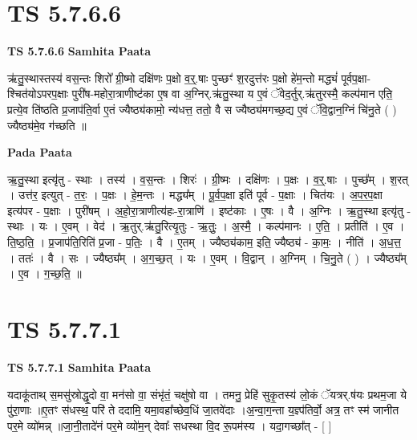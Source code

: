 \documentclass[17pt]{extarticle}
\begin{document}

\section{ TS 5.7.6.6 }

\textbf{TS 5.7.6.6 } \newline
\textbf{Samhita Paata} \newline

ऋ॑तु॒स्थास्तस्य॑ वस॒न्तः शिरो᳚ ग्री॒ष्मो दक्षि॑णः प॒क्षो व॒र्॒.षाः पुच्छꣳ॑ श॒रदुत्त॑रः प॒क्षो हे॑म॒न्तो मद्ध्यं॑ पूर्वप॒क्षा-श्चित॑योऽपरप॒क्षाः पुरी॑ष-महोरा॒त्राणीष्ट॑का ए॒ष वा अ॒ग्निर्.ऋ॑तु॒स्था य ए॒वं ॅवेद॒र्तुर्.ऋ॑तुरस्मै॒ कल्प॑मान एति॒ प्रत्ये॒व ति॑ष्ठति प्र॒जाप॑ति॒र्वा ए॒तं ज्यैष्ठ्य॑कामो॒ न्य॑धत्त॒ ततो॒ वै स ज्यैष्ठ्य॑मगच्छ॒द्य ए॒वं ॅवि॒द्वान॒ग्निं चि॑नु॒ते ( ) ज्यैष्ठ्य॑मे॒व ग॑च्छति ॥ \newline

\textbf{Pada Paata} \newline

ऋ॒तु॒स्था इत्यृ॑तु - स्थाः । तस्य॑ । व॒स॒न्तः । शिरः॑ । ग्री॒ष्मः । दक्षि॑णः । प॒क्षः । व॒र्॒.षाः । पुच्छ᳚म् । श॒रत् । उत्त॑र॒ इत्युत् - त॒रः॒ । प॒क्षः । हे॒म॒न्तः । मद्ध्य᳚म् । पू॒र्व॒प॒क्षा इति॑ पूर्व - प॒क्षाः । चित॑यः । अ॒प॒र॒प॒क्षा इत्य॑पर - प॒क्षाः । पुरी॑षम् । अ॒हो॒रा॒त्राणीत्य॑हः-रा॒त्राणि॑ । इष्ट॑काः । ए॒षः । वै । अ॒ग्निः । ऋ॒तु॒स्था इत्यृ॑तु - स्थाः । यः । ए॒वम् । वेद॑ । ऋ॒तुर्.ऋ॑तु॒रित्यृ॒तुः - ऋ॒तुः॒ । अ॒स्मै॒ । कल्प॑मानः । ए॒ति॒ । प्रतीति॑ । ए॒व । ति॒ष्ठ॒ति॒ । प्र॒जाप॑ति॒रिति॑ प्र॒जा - प॒तिः॒ । वै । ए॒तम् । ज्यैष्ठ्य॑काम॒ इति॒ ज्यैष्ठ्य॑ - का॒मः॒ । नीति॑ । अ॒ध॒त्त॒ । ततः॑ । वै । सः । ज्यैष्ठ्य᳚म् । अ॒ग॒च्छ॒त् । यः । ए॒वम् । वि॒द्वान् । अ॒ग्निम् । चि॒नु॒ते ( ) । ज्यैष्ठ्य᳚म् । ए॒व । ग॒च्छ॒ति॒ ॥  \newline





\section{ TS 5.7.7.1 }

\textbf{TS 5.7.7.1 } \newline
\textbf{Samhita Paata} \newline

यदाकू॑ताथ् स॒मसु॑स्रोद्धृ॒दो वा॒ मन॑सो वा॒ संभृ॑तं॒ चक्षु॑षो वा । तमनु॒ प्रेहि॑ सुकृ॒तस्य॑ लो॒कं ॅयत्रर्.ष॑यः प्रथम॒जा ये पु॑रा॒णाः ॥ए॒तꣳ स॑धस्थ॒ परि॑ ते ददामि॒ यमा॒वहा᳚च्छेव॒धिं जा॒तवे॑दाः ।अ॒न्वा॒ग॒न्ता य॒ज्ञ्प॑तिर्वो॒ अत्र॒ तꣳ स्म॑ जानीत पर॒मे व्यो॑मन्न् ॥जा॒नी॒तादे॑नं पर॒मे व्यो॑म॒न् देवाः᳚ सधस्था वि॒द रू॒पम॑स्य । यदा॒गच्छा᳚त् - [  ] \newline
\end{document}
